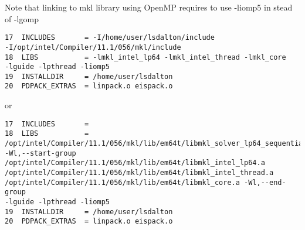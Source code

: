 Note that linking to mkl library using OpenMP requires to use -liomp5 in stead of -lgomp
\begin{verbatim}
17  INCLUDES       = -I/home/user/lsdalton/include 
-I/opt/intel/Compiler/11.1/056/mkl/include
18  LIBS           = -lmkl_intel_lp64 -lmkl_intel_thread -lmkl_core 
-lguide -lpthread -liomp5
19  INSTALLDIR     = /home/user/lsdalton
20  PDPACK_EXTRAS  = linpack.o eispack.o
\end{verbatim}
or
\begin{verbatim}
17  INCLUDES       = 
18  LIBS           = 
/opt/intel/Compiler/11.1/056/mkl/lib/em64t/libmkl_solver_lp64_sequential.a 
-Wl,--start-group /opt/intel/Compiler/11.1/056/mkl/lib/em64t/libmkl_intel_lp64.a 
/opt/intel/Compiler/11.1/056/mkl/lib/em64t/libmkl_intel_thread.a 
/opt/intel/Compiler/11.1/056/mkl/lib/em64t/libmkl_core.a -Wl,--end-group 
-lguide -lpthread -liomp5 
19  INSTALLDIR     = /home/user/lsdalton
20  PDPACK_EXTRAS  = linpack.o eispack.o
\end{verbatim}

%
%


